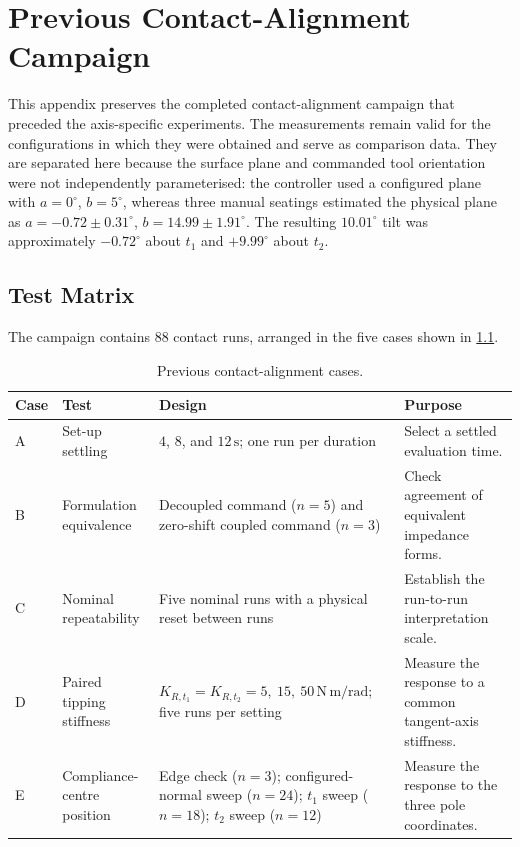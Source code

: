 \chapter{Previous Contact-Alignment Campaign}
\label{app:previous_campaign}

This appendix preserves the completed contact-alignment campaign that preceded
the axis-specific experiments. The measurements remain valid for the
configurations in which they were obtained and serve as comparison data.
They are separated here because the surface plane and commanded tool
orientation were not independently parameterised: the controller used a
configured plane with \(a=0^\circ\), \(b=5^\circ\), whereas three manual
seatings estimated the physical plane as
\(a=-0.72\pm0.31^\circ\), \(b=14.99\pm1.91^\circ\). The resulting
\(10.01^\circ\) tilt was approximately
\(-0.72^\circ\) about \(t_1\) and \(+9.99^\circ\) about \(t_2\).

\section{Test Matrix}

The campaign contains \(88\) contact runs, arranged in the five cases shown in
\cref{tab:previous_campaign_cases}.

\begin{table}[H]
\centering
\small
\caption{Previous contact-alignment cases.}
\label{tab:previous_campaign_cases}
\begin{tabular}{@{}
>{\centering\arraybackslash}p{}
>{\raggedright\arraybackslash}p{}
>{\raggedright\arraybackslash}p{}
>{\raggedright\arraybackslash}p{}@{}}
\toprule
Case & Test & Design & Purpose \\
\midrule
A &
Set-up settling &
\(4\), \(8\), and \(12\,\mathrm{s}\); one run per duration &
Select a settled evaluation time. \\
B &
Formulation equivalence &
Decoupled command (\(n=5\)) and zero-shift coupled command (\(n=3\)) &
Check agreement of equivalent impedance forms. \\
C &
Nominal repeatability &
Five nominal runs with a physical reset between runs &
Establish the run-to-run interpretation scale. \\
D &
Paired tipping stiffness &
\(K_{R,t_1}=K_{R,t_2}=5,\ 15,\ 50\,\mathrm{N\,m/rad}\);
five runs per setting &
Measure the response to a common tangent-axis stiffness. \\
E &
Compliance-centre position &
Edge check (\(n=3\)); configured-normal sweep (\(n=24\));
\(t_1\) sweep (\(n=18\)); \(t_2\) sweep (\(n=12\)) &
Measure the response to the three pole coordinates. \\
\bottomrule
\end{tabular}
\end{table}

